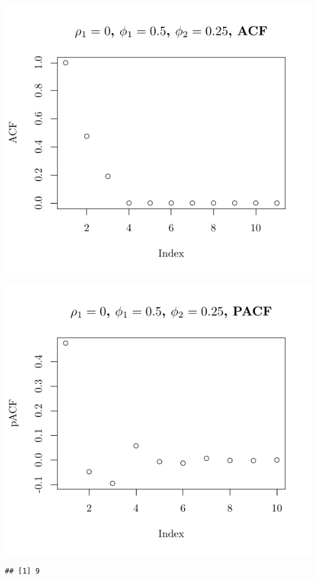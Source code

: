 \documentclass[10pt]{paper}\usepackage[]{graphicx}\usepackage[]{color}
\makeatletter
\def\maxwidth{ %
  \ifdim\Gin@nat@width>\linewidth
    \linewidth
  \else
    \Gin@nat@width
  \fi
}
\newenvironment{kframe}{%
 \def\at@end@of@kframe{}%
 \ifinner\ifhmode%
  \def\at@end@of@kframe{\end{minipage}}%
  \begin{minipage}{\columnwidth}%
 \fi\fi%
 \def\FrameCommand##1{\hskip\@totalleftmargin \hskip-\fboxsep
 \colorbox{shadecolor}{##1}\hskip-\fboxsep
     \hskip-\linewidth \hskip-\@totalleftmargin \hskip\columnwidth}%
 \MakeFramed {\advance\hsize-\width
   \@totalleftmargin\z@ \linewidth\hsize
   \@setminipage}}%
 {\par\unskip\endMakeFramed%
 \at@end@of@kframe}
\newenvironment{knitrout}{}{} %
\makeatother
\begin{document}
\begin{knitrout}
{\centering \includegraphics[width=\maxwidth]{figure/graphics-plotter-39} 

}




{\centering \includegraphics[width=\maxwidth]{figure/graphics-plotter-40} 

}


\begin{kframe}\begin{verbatim}
## [1] 9
\end{verbatim}
\end{kframe}


\end{knitrout}
\end{document}
